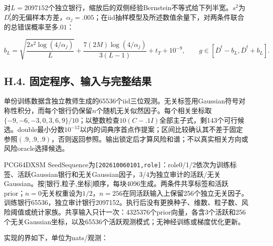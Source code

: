 \documentclass[11pt,a4paper]{article}
\begin{document}
对\(L=2097152\)个独立银行，缩放后的双侧经验Bernstein不等式\citep[Theorem
4]{maurer2009}给下列半宽。\(s^2\)为\(D_b^t\)的无偏样本方差，\(\alpha_j=.005\)；在iid抽样模型及所述数值余量下，对两条件联合的总错误概率至多\(.01\)：

\[
b_L=\sqrt{\frac{2s^2\log(4/\alpha_j)}{L}}
+\frac{7(2M)\log(4/\alpha_j)}{3(L-1)}+t_T+10^{-9},
\qquad g\in[\overline D^t-b_L,\overline D^t+b_L].
\tag{H.9}
\]

\subsection*{H.4.
固定程序、输入与完整结果}\label{h.4.-ux56faux5b9aux7a0bux5e8fux8f93ux5165ux4e0eux5b8cux6574ux7ed3ux679c}

单份训练数据含独立教师生成的65536个iid三位观测。无关标签用Gaussian符号对称性积分，而每个银行仍保留\(n\)个随机无关似然因子。每个相关坐标取\(\{-9,-6,-3,0,3,6,9\}/10\)；以整数检查\(10(C-.1I)\)全部主子式，剩143个可行候选。double最小分数\(10^{-12}\)以内的词典序首点作提案；区间比较确认其不差于固定参照\((.9,.9,.9)\)，否则返回参照。输出锁定后才算风险和谱；不以真实相关方向或风险oracle选择候选。

PCG64DXSM
SeedSequence为\texttt{{[}202610060101,role{]}}：role0/1/2依次为训练标签、活跃Gaussian银行和无关Gaussian因子，3/4为独立审计的活跃/无关Gaussian。按{[}银行,粒子,坐标{]}顺序，每块4096生成。两条件共享标签和活跃prior；\(n=0\)无关权重设为\(1/2\)，\(n=256\)在同活跃输入上保留256个独立无关因子。训练银行65536，独立审计银行2097152。执行后没有更换种子、维数、粒子数、风险阈值或统计家族。共享输入只计一次：4325376个prior向量，各含3个活跃和256个无关Gaussian坐标，以及65536个活跃观测模式；无神经训练或梯度优化更新。

实现的界如下，单位为nats/观测：
\end{document}
